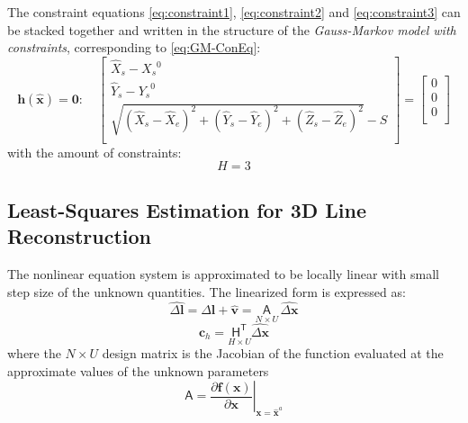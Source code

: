The constraint equations \eqref{eq:constraint1}, \eqref{eq:constraint2} and \eqref{eq:constraint3} can be stacked together and written in the structure of the \textit{Gauss-Markov model with constraints}, corresponding to \cref{eq:GM-ConEq}:
\begin{equation} \label{eq:convec}
\boldsymbol h(\widehat{\boldsymbol x})=\mathbf{0}:\quad
\begin{bmatrix}
 \hat{X}_s-{X_s}^0\\[0.3em]
 \hat{Y}_s-{Y_s}^0\\[0.3em]
 \sqrt{(\hat{X}_s-\hat{X}_e)^2+(\hat{Y}_s-\hat{Y}_e)^2+(\hat{Z}_s-\hat{Z}_e)^2}-S\\[0.3em]
\end{bmatrix}
=
\begin{bmatrix}
 0\\[0.3em]
 0\\[0.3em]
 0\\[0.5em]
\end{bmatrix}
\end{equation}
with the amount of constraints:
\begin{equation}
H=3
\end{equation}

\subsection{Least-Squares Estimation for 3D Line Reconstruction}
\label{subsec:LSadj}

The nonlinear equation system is approximated to be locally linear with small step size of the unknown quantities. The linearized form is expressed as:
\begin{equation} \label{eq:GM-ObsEq-linear}
\widehat{\Delta\boldsymbol l}=\Delta\boldsymbol l+\widehat{\boldsymbol v}=\underset{N\times U}{\mathsf{A}}\,\widehat{\Delta\boldsymbol x}
\end{equation}
\begin{equation} \label{eq:GM-ConEq-linear}
\boldsymbol c_h=\underset{H\times U}{\mathsf{H^T}}\widehat{\Delta\boldsymbol x}
\end{equation}
where\newline
the $N\times U$ design matrix is the Jacobian of the function evaluated at the approximate values of the unknown parameters
\begin{equation*}
\mathsf{A}=\left.\dfrac{\partial\boldsymbol f(\boldsymbol x)}{\partial\boldsymbol x}\right|_{\boldsymbol x=\widehat{\boldsymbol x}^a}
\end{equation*}

